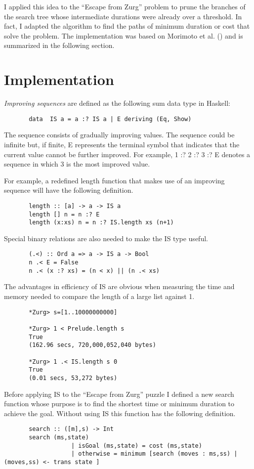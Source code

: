 \documentclass[journal,onecolumn]{IEEEtran}
\begin{document}
I applied this idea to the ``Escape from Zurg'' problem to prune the branches of the search tree whose intermediate durations were already over a threshold.  In fact, I adapted the algorithm to find the paths of minimum duration or cost that solve the problem.  The implementation was based on Morimoto et al. (\cite{morimoto}) and is summarized in the following section.


\section{Implementation}
\textit{Improving sequences} are defined as the following sum data type in Haskell:
\begin{lstlisting}
       data  IS a = a :? IS a | E deriving (Eq, Show)
\end{lstlisting}

The sequence consists of gradually improving values.  The sequence could be infinite but, if finite, \textsf{E} represents the terminal symbol that indicates that the current value cannot be further improved.  For example, \textsf{1 :? 2 :? 3 :? E} denotes a sequence in which \textsc{3} is the most improved value.

For example, a redefined \textsf{length} function that makes use of an improving sequence will have the following definition.
\begin{lstlisting}
       length :: [a] -> a -> IS a
       length [] n = n :? E
       length (x:xs) n = n :? IS.length xs (n+1)
\end{lstlisting}

Special binary relations are also needed to make the IS type useful. 
\begin{lstlisting}
       (.<) :: Ord a => a -> IS a -> Bool
       n .< E = False
       n .< (x :? xs) = (n < x) || (n .< xs)
\end{lstlisting}

The advantages in efficiency of IS are obvious when measuring the time and memory needed to compare the length of a large list against 1.
\begin{lstlisting}
       *Zurg> s=[1..10000000000]
       
       *Zurg> 1 < Prelude.length s
       True
       (162.96 secs, 720,000,052,040 bytes)
       
       *Zurg> 1 .< IS.length s 0  
       True
       (0.01 secs, 53,272 bytes)
\end{lstlisting}

Before applying IS to the ``Escape from Zurg'' puzzle I defined a new \textsf{search} function whose purpose is to find the shortest time or minimum duration to achieve the goal.  Without using IS this function has the following definition.
\begin{lstlisting}
       search :: ([m],s) -> Int
       search (ms,state)
                   | isGoal (ms,state) = cost (ms,state)
                   | otherwise = minimum [search (moves : ms,ss) | (moves,ss) <- trans state ]
\end{lstlisting}
\end{document}
